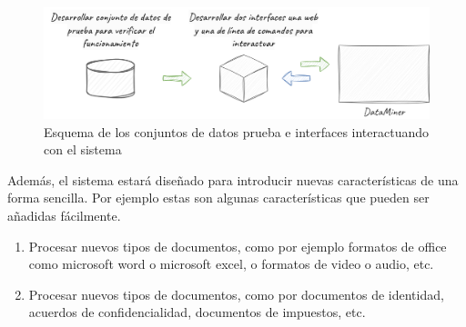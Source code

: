 \begin{figure}[ht]
    \begin{center}
        \includegraphics[width=\textwidth]{chapter/1/images/chapter_1.specific_b}
        \caption{Esquema de los conjuntos de datos prueba e interfaces interactuando con el sistema}
        \label{fig:chapter_1.specific_b}
    \end{center}
\end{figure}

Además, el sistema estará diseñado para introducir nuevas características de una forma sencilla.
Por ejemplo estas son algunas características que pueden ser añadidas fácilmente.

\begin{enumerate}
    \item
    Procesar nuevos tipos de documentos, como por ejemplo formatos de office como microsoft word o microsoft excel,
    o formatos de video o audio, etc.
    \item
    Procesar nuevos tipos de documentos, como por documentos de identidad, acuerdos de confidencialidad, documentos
    de impuestos, etc.
\end{enumerate}